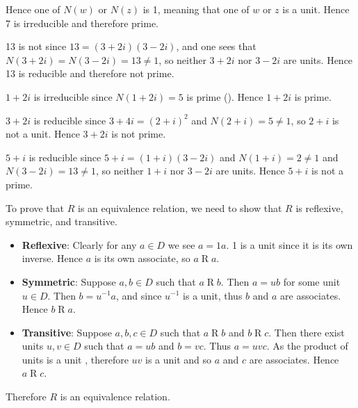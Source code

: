 \begin{questions}
\begin{partquestions}{\alph*}
        Hence one of $N(w)$ or $N(z)$ is 1, meaning that one of $w$ or $z$ is a unit. Hence 7 is irreducible and therefore prime.
        
        \item 13 is not since $13 = (3+2i)(3-2i)$, and one sees that $N(3+2i) = N(3-2i) = 13 \neq 1$, so neither $3+2i$ nor $3-2i$ are units. Hence 13 is reducible and therefore not prime.
        
        \item $1+2i$ is irreducible since $N(1+2i) = 5$ is prime (). Hence $1+2i$ is prime.
        
        \item $3+2i$ is reducible since $3+4i = (2+i)^2$ and $N(2+i) = 5 \neq 1$, so $2+i$ is not a unit. Hence $3+2i$ is not prime.
        
        \item $5+i$ is reducible since $5+i = (1+i)(3-2i)$ and $N(1+i) = 2 \neq 1$ and $N(3-2i) = 13 \neq 1$, so neither $1+i$ nor $3-2i$ are units. Hence $5+i$ is not a prime.
    \end{partquestions}

    \item To prove that $R$ is an equivalence relation, we need to show that $R$ is reflexive, symmetric, and transitive.
    \begin{itemize}
        \item \textbf{Reflexive}: Clearly for any $a \in D$ we see $a = 1a$. 1 is a unit since it is its own inverse. Hence $a$ is its own associate, so $a\mathrel{R}a$.
        
        \item \textbf{Symmetric}: Suppose $a,b \in D$ such that $a\mathrel{R}b$. Then $a = ub$ for some unit $u \in D$. Then $b = u^{-1}a$, and since $u^{-1}$ is a unit, thus $b$ and $a$ are associates. Hence $b\mathrel{R}a$.
        
        \item \textbf{Transitive}: Suppose $a,b,c\in D$ such that $a\mathrel{R}b$ and $b\mathrel{R}c$. Then there exist units $u,v \in D$ such that $a = ub$ and $b = vc$. Thus $a = uvc$. As the product of units is a unit , therefore $uv$ is a unit and so $a$ and $c$ are associates. Hence $a\mathrel{R}c$.
    \end{itemize}
    Therefore $R$ is an equivalence relation.
    

\end{questions}
